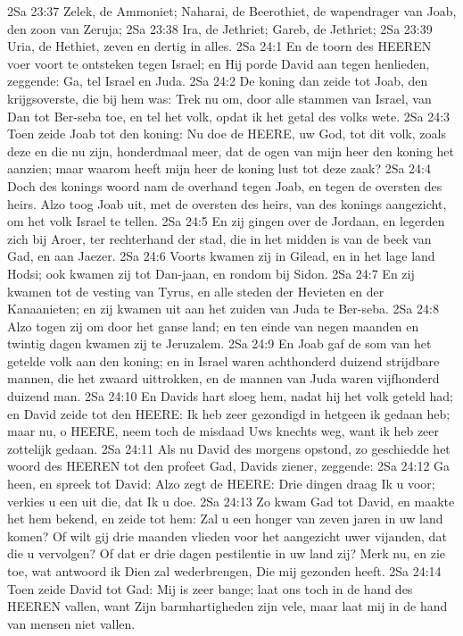 2Sa 23:37  Zelek, de Ammoniet; Naharai, de Beerothiet, de wapendrager van Joab, den zoon van Zeruja;
2Sa 23:38  Ira, de Jethriet; Gareb, de Jethriet;
2Sa 23:39  Uria, de Hethiet, zeven en dertig in alles.
2Sa 24:1  En de toorn des HEEREN voer voort te ontsteken tegen Israel; en Hij porde David aan tegen henlieden, zeggende: Ga, tel Israel en Juda.
2Sa 24:2  De koning dan zeide tot Joab, den krijgsoverste, die bij hem was: Trek nu om, door alle stammen van Israel, van Dan tot Ber-seba toe, en tel het volk, opdat ik het getal des volks wete.
2Sa 24:3  Toen zeide Joab tot den koning: Nu doe de HEERE, uw God, tot dit volk, zoals deze en die nu zijn, honderdmaal meer, dat de ogen van mijn heer den koning het aanzien; maar waarom heeft mijn heer de koning lust tot deze zaak?
2Sa 24:4  Doch des konings woord nam de overhand tegen Joab, en tegen de oversten des heirs. Alzo toog Joab uit, met de oversten des heirs, van des konings aangezicht, om het volk Israel te tellen.
2Sa 24:5  En zij gingen over de Jordaan, en legerden zich bij Aroer, ter rechterhand der stad, die in het midden is van de beek van Gad, en aan Jaezer.
2Sa 24:6  Voorts kwamen zij in Gilead, en in het lage land Hodsi; ook kwamen zij tot Dan-jaan, en rondom bij Sidon.
2Sa 24:7  En zij kwamen tot de vesting van Tyrus, en alle steden der Hevieten en der Kanaanieten; en zij kwamen uit aan het zuiden van Juda te Ber-seba.
2Sa 24:8  Alzo togen zij om door het ganse land; en ten einde van negen maanden en twintig dagen kwamen zij te Jeruzalem.
2Sa 24:9  En Joab gaf de som van het getelde volk aan den koning; en in Israel waren achthonderd duizend strijdbare mannen, die het zwaard uittrokken, en de mannen van Juda waren vijfhonderd duizend man.
2Sa 24:10  En Davids hart sloeg hem, nadat hij het volk geteld had; en David zeide tot den HEERE: Ik heb zeer gezondigd in hetgeen ik gedaan heb; maar nu, o HEERE, neem toch de misdaad Uws knechts weg, want ik heb zeer zottelijk gedaan.
2Sa 24:11  Als nu David des morgens opstond, zo geschiedde het woord des HEEREN tot den profeet Gad, Davids ziener, zeggende:
2Sa 24:12  Ga heen, en spreek tot David: Alzo zegt de HEERE: Drie dingen draag Ik u voor; verkies u een uit die, dat Ik u doe.
2Sa 24:13  Zo kwam Gad tot David, en maakte het hem bekend, en zeide tot hem: Zal u een honger van zeven jaren in uw land komen? Of wilt gij drie maanden vlieden voor het aangezicht uwer vijanden, dat die u vervolgen? Of dat er drie dagen pestilentie in uw land zij? Merk nu, en zie toe, wat antwoord ik Dien zal wederbrengen, Die mij gezonden heeft.
2Sa 24:14  Toen zeide David tot Gad: Mij is zeer bange; laat ons toch in de hand des HEEREN vallen, want Zijn barmhartigheden zijn vele, maar laat mij in de hand van mensen niet vallen.
